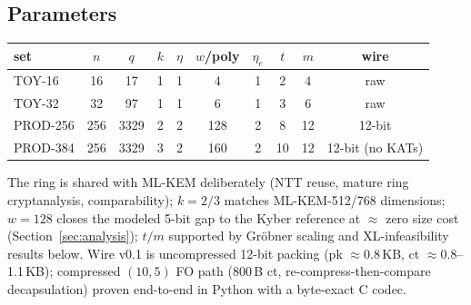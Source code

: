 \subsection{Parameters}

\begin{center}
\begin{tabular}{lccccccccc}
\toprule
set & $n$ & $q$ & $k$ & $\eta$ & $w$/poly & $\eta_e$ & $t$ & $m$ & wire \\
\midrule
TOY-16 & 16 & 17 & 1 & 1 & 4 & 1 & 2 & 4 & raw \\
TOY-32 & 32 & 97 & 1 & 1 & 6 & 1 & 3 & 6 & raw \\
PROD-256 & 256 & 3329 & 2 & 2 & 128 & 2 & 8 & 12 & 12-bit \\
PROD-384 & 256 & 3329 & 3 & 2 & 160 & 2 & 10 & 12 & 12-bit (no KATs) \\
\bottomrule
\end{tabular}
\end{center}
The ring is shared with ML-KEM deliberately (NTT reuse, mature ring
cryptanalysis, comparability); $k{=}2/3$ matches ML-KEM-512/768 dimensions;
$w{=}128$ closes the modeled 5-bit gap to the Kyber reference at $\approx$
zero size cost (Section~\ref{sec:analysis}); $t/m$ supported by Gr\"obner
scaling and XL-infeasibility results below. Wire v0.1 is uncompressed
12-bit packing (pk $\approx$0.8\,KB, ct $\approx$0.8--1.1\,KB); compressed
$(10,5)$ FO path (800\,B ct, re-compress-then-compare decapsulation) proven
end-to-end in Python with a byte-exact C codec.
